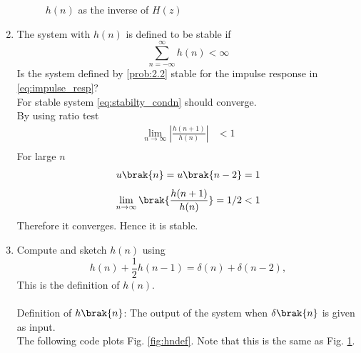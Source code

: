 \documentclass[journal,12pt,twocolumn]{IEEEtran}
\theoremstyle{remark}
\begin{document}
\begin{enumerate}[label=\thesection.\arabic*]
\begin{figure}[H]
\caption{$h(n)$ as the inverse of $H(z)$}
\label{fig:hn}
\end{figure}
%
\item The system with $h(n)$ is defined to be stable if
\begin{equation}
\sum_{n=-\infty}^{\infty}h(n) < \infty \label{eq:stabilty_condn}
\end{equation}
Is the system defined by \eqref{prob:2.2} stable for the impulse response in \eqref{eq:impulse_resp}?\\
\solution For stable system \eqref{eq:stabilty_condn} should converge.\\
By using ratio test
\begin{align}
    \lim_{n \to \infty}\left|\frac{h(n + 1)}{h(n)}\right|&<1 \\
\end{align}
For large $n$ 
\begin{align}
    u\brak{n}=u\brak{n-2}=1
\end{align}
\begin{align}
  \lim_{n \to \infty}  \brak{\frac{h(n + 1)}{h(n)}} = 1/2 <1
\end{align}
Therefore it converges. Hence it is stable.
\item 
Compute and sketch $h(n)$ using 
\begin{equation}
\label{eq:iir_filter_h}
h(n) + \frac{1}{2}h(n-1) = \delta(n) + \delta(n-2), 
\end{equation}
%
This is the definition of $h(n)$.
\\
\solution\\
Definition of $h\brak{n}$: The output of the system when $\delta\brak{n}$ is given as input.\\

The following code plots Fig. \ref{fig:hndef}. Note that this is the same as Fig. 
\ref{fig:hn}. 


\end{enumerate}
\end{document}
